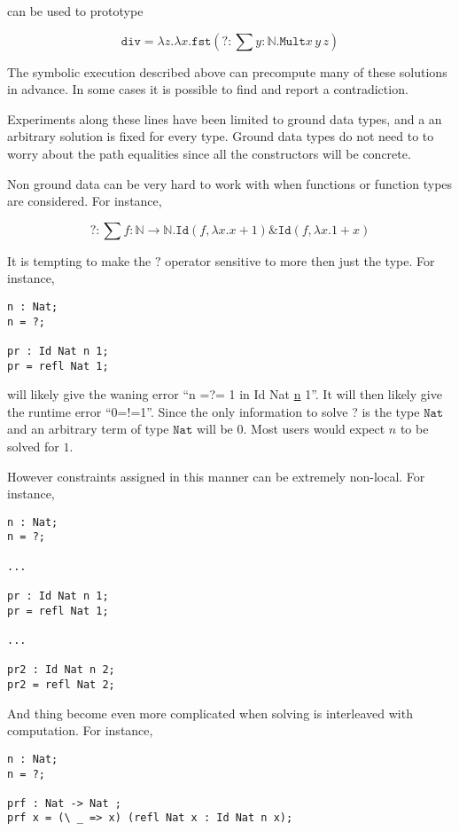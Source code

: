 can be used to prototype

\[
\mathtt{div}=\lambda z.\lambda x.\mathtt{fst}\left(?:\sum y:\mathbb{N}.\mathtt{Mult}x\,y\,z\right)
\]

The symbolic execution described above can precompute many of these
solutions in advance. In some cases it is possible to find and report
a contradiction. 

Experiments along these lines have been limited to ground data types,
and a an arbitrary solution is fixed for every type. Ground data types
do not need to to worry about the path equalities since all the constructors
will be concrete.

Non ground data can be very hard to work with when functions or function
types are considered. For instance,

\[
?:\sum f:\mathbb{N}\rightarrow\mathbb{N}.\mathtt{Id}\left(f,\lambda x.x+1\right)\&\mathtt{Id}\left(f,\lambda x.1+x\right)
\]

It is tempting to make the $?$ operator sensitive to more then just
the type. For instance,

\begin{lstlisting}
n : Nat;
n = ?;

pr : Id Nat n 1;
pr = refl Nat 1;
\end{lstlisting}

will likely give the waning error ``n =?= 1 in Id Nat \uline{n}
1''. It will then likely give the runtime error ``0=!=1''. Since
the only information to solve ? is the type $\mathtt{Nat}$ and an
arbitrary term of type $\mathtt{Nat}$ will be 0. Most users would
expect $n$ to be solved for $1$.

However constraints assigned in this manner can be extremely non-local.
For instance,

\begin{lstlisting}
n : Nat;
n = ?;

...

pr : Id Nat n 1;
pr = refl Nat 1;

...

pr2 : Id Nat n 2;
pr2 = refl Nat 2;
\end{lstlisting}

And thing become even more complicated when solving is interleaved
with computation. For instance,

\begin{lstlisting}
n : Nat;
n = ?;

prf : Nat -> Nat ;
prf x = (\ _ => x) (refl Nat x : Id Nat n x);
\end{lstlisting}


